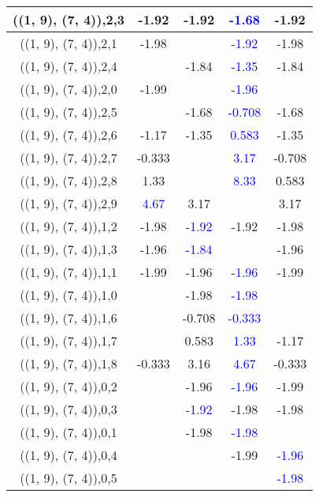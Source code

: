 \documentclass{article}
\begin{document}
\begin{center}
\begin{longtable}{|c|c|c|c|c|}
        	\hline
        	((1, 9), (7, 4)),2,3&-1.92&-1.92& \textcolor{blue}{-1.68}&-1.92\\
        	\hline
        	((1, 9), (7, 4)),2,1&-1.98&& \textcolor{blue}{-1.92}&-1.98\\
        	\hline
        	((1, 9), (7, 4)),2,4&&-1.84& \textcolor{blue}{-1.35}&-1.84\\
        	\hline
        	((1, 9), (7, 4)),2,0&-1.99&& \textcolor{blue}{-1.96}&\\
        	\hline
        	((1, 9), (7, 4)),2,5&&-1.68& \textcolor{blue}{-0.708}&-1.68\\
        	\hline
        	((1, 9), (7, 4)),2,6&-1.17&-1.35& \textcolor{blue}{0.583}&-1.35\\
        	\hline
        	((1, 9), (7, 4)),2,7&-0.333&& \textcolor{blue}{3.17}&-0.708\\
        	\hline
        	((1, 9), (7, 4)),2,8&1.33&& \textcolor{blue}{8.33}&0.583\\
        	\hline
        	((1, 9), (7, 4)),2,9& \textcolor{blue}{4.67}&3.17&&3.17\\
        	\hline
        	((1, 9), (7, 4)),1,2&-1.98& \textcolor{blue}{-1.92}&-1.92&-1.98\\
        	\hline
        	((1, 9), (7, 4)),1,3&-1.96& \textcolor{blue}{-1.84}&&-1.96\\
        	\hline
        	((1, 9), (7, 4)),1,1&-1.99&-1.96& \textcolor{blue}{-1.96}&-1.99\\
        	\hline
        	((1, 9), (7, 4)),1,0&&-1.98& \textcolor{blue}{-1.98}&\\
        	\hline
        	((1, 9), (7, 4)),1,6&&-0.708& \textcolor{blue}{-0.333}&\\
        	\hline
        	((1, 9), (7, 4)),1,7&&0.583& \textcolor{blue}{1.33}&-1.17\\
        	\hline
        	((1, 9), (7, 4)),1,8&-0.333&3.16& \textcolor{blue}{4.67}&-0.333\\
        	\hline
        	((1, 9), (7, 4)),0,2&&-1.96& \textcolor{blue}{-1.96}&-1.99\\
        	\hline
        	((1, 9), (7, 4)),0,3&& \textcolor{blue}{-1.92}&-1.98&-1.98\\
        	\hline
        	((1, 9), (7, 4)),0,1&&-1.98& \textcolor{blue}{-1.98}&\\
        	\hline
        	((1, 9), (7, 4)),0,4&&&-1.99& \textcolor{blue}{-1.96}\\
        	\hline
        	((1, 9), (7, 4)),0,5&&&& \textcolor{blue}{-1.98}\\

\end{longtable}
\end{center}
\end{document}
